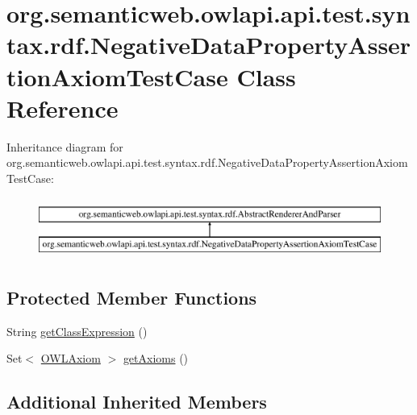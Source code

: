 \hypertarget{classorg_1_1semanticweb_1_1owlapi_1_1api_1_1test_1_1syntax_1_1rdf_1_1_negative_data_property_assertion_axiom_test_case}{\section{org.\-semanticweb.\-owlapi.\-api.\-test.\-syntax.\-rdf.\-Negative\-Data\-Property\-Assertion\-Axiom\-Test\-Case Class Reference}
\label{classorg_1_1semanticweb_1_1owlapi_1_1api_1_1test_1_1syntax_1_1rdf_1_1_negative_data_property_assertion_axiom_test_case}
}
Inheritance diagram for org.\-semanticweb.\-owlapi.\-api.\-test.\-syntax.\-rdf.\-Negative\-Data\-Property\-Assertion\-Axiom\-Test\-Case\-:\begin{figure}[H]
\begin{center}
\leavevmode
\includegraphics[height=2.000000cm]{classorg_1_1semanticweb_1_1owlapi_1_1api_1_1test_1_1syntax_1_1rdf_1_1_negative_data_property_assertion_axiom_test_case}
\end{center}
\end{figure}
\subsection*{Protected Member Functions}
\begin{DoxyCompactItemize}
\item 
String \hyperlink{classorg_1_1semanticweb_1_1owlapi_1_1api_1_1test_1_1syntax_1_1rdf_1_1_negative_data_property_assertion_axiom_test_case_a192c4d957c189821bbce80b9c058ce3e}{get\-Class\-Expression} ()
\item 
Set$<$ \hyperlink{interfaceorg_1_1semanticweb_1_1owlapi_1_1model_1_1_o_w_l_axiom}{O\-W\-L\-Axiom} $>$ \hyperlink{classorg_1_1semanticweb_1_1owlapi_1_1api_1_1test_1_1syntax_1_1rdf_1_1_negative_data_property_assertion_axiom_test_case_a6acca89e4b19f0a08d0deb0966e92f64}{get\-Axioms} ()
\end{DoxyCompactItemize}
\subsection*{Additional Inherited Members}


